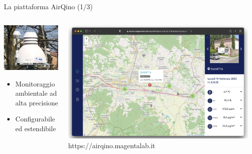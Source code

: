 \begin{frame}{La piattaforma AirQino (1/3)}
\begin{columns}


\begin{column}{0.4\textwidth}
\begin{center}
\includegraphics[width=.7\textwidth]{images/airqino_stazione}

\begin{itemize}
  \item Monitoraggio ambientale ad alta precisione
  \item Configurabile ed estendibile
\end{itemize}

\end{center}
\end{column}

\begin{column}{0.6\textwidth}

\begin{center}
\includegraphics[width=\textwidth]{images/airqino_web}
\alert{https://airqino.magentalab.it}
\end{center}

\end{column}

\end{columns}
\end{frame}

